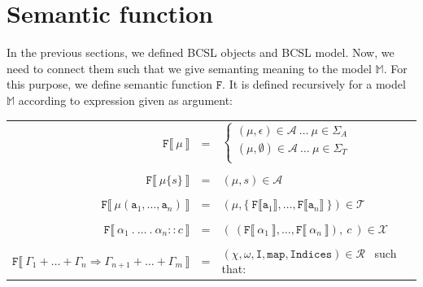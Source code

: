 \documentclass[12pt]{fithesis2}
\begin{document}
\section{Semantic function}

In the previous sections, we defined BCSL objects and BCSL model. Now, we need to connect them such that we give semanting meaning to the model $\mathds{M}$. For this purpose, we define semantic function $\mathtt{F}$. It is defined recursively for a model $\mathds{M}$ according to expression given as argument:

\begin{center}
\begin{tabular}{ r c l}
$\mathtt{F} \llbracket ~\mu~ \rrbracket$ & = &
    $\begin{cases}
    (\mu, \epsilon) \in \mathcal{A} ~\ldots~ \mu \in \Sigma_{A}\\
    (\mu, \emptyset) \in \mathcal{A} ~\ldots~ \mu \in \Sigma_{T}\\
    \end{cases}
    $\\
 & & \\
$\mathtt{F} \llbracket ~\mu\{s\}~ \rrbracket$ & = & $(\mu, s) \in \mathcal{A}$\\
 & & \\
$\mathtt{F} \llbracket ~\mu(\mathtt{a}_1, \ldots, \mathtt{a}_n)~ \rrbracket$ & = &
$(\mu, \{~ \mathtt{F} \llbracket \mathtt{a}_1 \rrbracket, \ldots, \mathtt{F} \llbracket \mathtt{a}_n \rrbracket ~\}) \in \mathcal{T}$\\
 & & \\
$\mathtt{F} \llbracket ~\alpha_1~.~\ldots~.~\alpha_n :: c~ \rrbracket$ & = &
$(~(\mathtt{F} \llbracket ~\alpha_1~ \rrbracket, \ldots, \mathtt{F} \llbracket ~\alpha_n~ \rrbracket), ~c~) \in \mathcal{X}$\\
 & & \\
$\mathtt{F} \llbracket ~\Gamma_1 + \ldots + \Gamma_n \Rightarrow \Gamma_{n+1} + \ldots + \Gamma_m~ \rrbracket$ & = &
$(\chi, \omega, \mathtt{I}, \mathtt{map}, \mathtt{Indices}) \in \mathcal{R}$~ such that:\\
\end{tabular}
\end{center}
\end{document}
